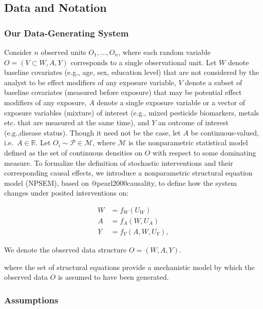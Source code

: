 \documentclass[
]{article}
\begin{document}
\hypertarget{data-and-notation}{%
\subsection{Data and Notation}\label{data-and-notation}}

\hypertarget{our-data-generating-system}{%
\subsubsection{Our Data-Generating
System}\label{our-data-generating-system}}

Consider \(n\) observed units \(O_1, \ldots, O_n\), where each random
variable \(O =(V \subset W, A, Y)\) corresponds to a single
observational unit. Let \(W\) denote baseline covariates (e.g., age,
sex, education level) that are not considered by the analyst to be
effect modifiers of any exposure variable, \(V\) denote a subset of
baseline covariates (measured before exposure) that may be potential
effect modifiers of any exposure, \(A\) denote a single exposure
variable or a vector of exposure variables (mixture) of interest (e.g.,
mixed pesticide biomarkers, metals etc. that are measured at the same
time), and \(Y\) an outcome of interest (e.g.,disease status). Though it
need not be the case, let \(A\) be continuous-valued,
i.e.~\(A \in \mathbb{R}\). Let \(O_i \sim \mathcal{P} \in \mathcal{M}\),
where \(\mathcal{M}\) is the nonparametric statistical model defined as
the set of continuous densities on \(O\) with respect to some dominating
measure. To formalize the definition of stochastic interventions and
their corresponding causal effects, we introduce a nonparametric
structural equation model (NPSEM), based on @pearl2000causality, to
define how the system changes under posited interventions on:

\begin{align*}\label{eqn:npsem}
  W &= f_W(U_W) \\ A &= f_A(W, U_A) \\ Y &= f_Y(A, W, U_Y),
\end{align*}

We denote the observed data structure \(O = (W, A, Y)\).

where the set of structural equations provide a mechanistic model by
which the observed data \(O\) is assumed to have been generated.

\hypertarget{assumptions}{%
\subsubsection{Assumptions}\label{assumptions}}
\end{document}
